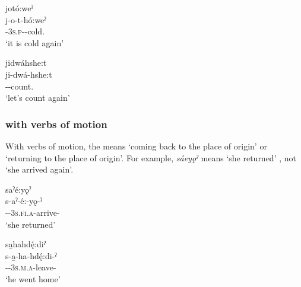 \ex jotó:weˀ\\
\gll j-o-t-hó:weˀ\\
{\repetitive}-\textsc{3s.p}-{\semireflexive}-cold.{\stative}\\
\glt `it is cold again'

\ex jidwáhshe:t\\
\gll ji-dwá-hshe:t\\
{\repetitive}--count.{\noaspect}\\
\glt `let’s count again'
\z
\z

\subsubsection*{ {\repetitive} with verbs of motion} \label{{[s-, j-, ji-] (repetitive) with verbs of motion}}
With verbs of motion, the  {\repetitive} means ‘coming back to the place of origin’ or ‘returning to the place of origin’. For example, \textit{sáeyǫˀ} means ‘she returned’ , not ‘she arrived again’.

\ea\label{ex:srepex2}

\ea saˀé:yǫˀ\\
\gll s-aˀ-é:-yǫ-ˀ\\
{\repetitive}-{\factual}-\textsc{3s.fi.a}-arrive-{\punctual}\\
\glt `she returned'

\ex sa̱hahdę́:diˀ\\
\gll s-a̱-ha-hdę́:di-ˀ\\
{\repetitive}-{\factual}-\textsc{3s.m.a}-leave-{\punctual}\\
\glt `he went home'


